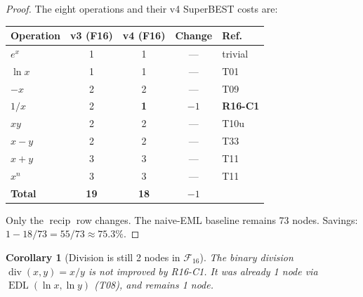 \documentclass[12pt,a4paper]{article}
\newtheorem{corollary}[theorem]{Corollary}
\theoremstyle{definition}
\newcommand{\EDL}{\operatorname{EDL}}
\newcommand{\recip}{\operatorname{recip}}
\begin{document}
\begin{proof}
The eight operations and their v4 SuperBEST costs are:

\smallskip
\begin{center}
\begin{tabular}{@{}lcccl@{}}
\toprule
\textbf{Operation} & \textbf{v3 (F16)} & \textbf{v4 (F16)} & \textbf{Change} & \textbf{Ref.} \\
\midrule
$e^x$    & 1 & 1 & --- & trivial \\
$\ln x$  & 1 & 1 & --- & T01 \\
$-x$     & 2 & 2 & --- & T09 \\
$1/x$    & 2 & \textbf{1} & $-1$ & \textbf{R16-C1} \\
$xy$     & 2 & 2 & --- & T10u \\
$x-y$    & 2 & 2 & --- & T33 \\
$x+y$    & 3 & 3 & --- & T11 \\
$x^n$    & 3 & 3 & --- & T11 \\
\midrule
\textbf{Total} & \textbf{19} & \textbf{18} & $-1$ & \\
\bottomrule
\end{tabular}
\end{center}
\smallskip

Only the $\recip$ row changes.  The naive-EML baseline remains 73 nodes.
Savings: $1 - 18/73 = 55/73 \approx 75.3\%$.
\end{proof}

\begin{corollary}[Division is still 2 nodes in $\mathcal{F}_{16}$]
\label{cor:div}
The binary division $\operatorname{div}(x,y) = x/y$ is \emph{not} improved by
R16-C1.  It was already 1 node via $\EDL(\ln x, \ln y)$ (T08), and
remains 1 node.
\end{corollary}
\end{document}
